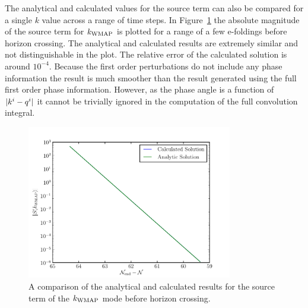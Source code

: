 The analytical and calculated values for the source term can also be compared for a single $k$
value across a range of time steps. In Figure~\ref{fig:analytic-prehorizon-res} the absolute
magnitude of the source term for $k_\mathrm{WMAP}$ is plotted for a range of a few e-foldings before horizon
crossing. The analytical and calculated results are extremely similar and not distinguishable in the
plot. The relative error of the calculated solution is around $10^{-4}$. Because the first order
perturbations do not include any phase information the result is much smoother than the result
generated using the full first order phase information. However, as the phase angle is a function of
$|k^i-q^i|$ it cannot be trivially ignored in the computation of the full convolution integral. 

\begin{figure}
 \centering
 \includegraphics[width=0.8\textwidth]{numerical/graphs/analytic_v_calced_prehorizon-large.pdf}
 \caption[Comparison of Solutions Before Horizon Crossing]{A comparison of the analytical and
calculated results for the source term of the $k_\mathrm{WMAP}$ mode before horizon crossing.}
 \label{fig:analytic-prehorizon-res}
\end{figure}


